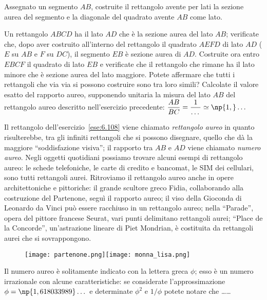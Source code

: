 \begin{esercizio}
\label{ese:6.107}
Assegnato un segmento $AB$, costruite il rettangolo avente per lati la sezione aurea del segmento e la diagonale del quadrato avente $AB$ come lato.
\end{esercizio}

\begin{esercizio}
\label{ese:6.108}
Un rettangolo $ABCD$ ha il lato $AD$ che è la sezione aurea del lato $AB$; verificate che, dopo aver costruito all'interno del rettangolo il quadrato $AEFD$ di lato $AD$ ($E$ su $AB$ e $F$ su $DC$), il segmento $EB$ è sezione aurea di $AD$. Costruite ora entro $EBCF$ il quadrato di lato $EB$ e verificate che il rettangolo che rimane ha il lato minore che è sezione aurea del lato maggiore. Potete affermare che tutti i rettangoli che via via si possono costruire sono tra loro simili? Calcolate il valore esatto del rapporto aureo, supponendo unitaria la misura del lato $AB$ del rettangolo aureo descritto nell'esercizio precedente: $\dfrac{AB}{BC}=\dfrac{1}{\ldots{}}\simeq \np{1,}\ldots{}$
\end{esercizio}

Il rettangolo dell'esercizio~\ref{ese:6.108} viene chiamato \emph{rettangolo aureo} in quanto risulterebbe, tra gli infiniti rettangoli che si possono disegnare, quello che dà la maggiore ``soddisfazione visiva''; il rapporto tra $AB$ e $AD$ viene chiamato \emph{numero aureo}. 
Negli oggetti quotidiani possiamo trovare alcuni esempi di rettangolo aureo: le schede telefoniche, le carte di credito e bancomat, le SIM dei cellulari, sono tutti rettangoli aurei.
Ritroviamo il rettangolo aureo anche in opere architettoniche e pittoriche: il grande scultore greco Fidia, collaborando alla costruzione del Partenone, seguì il rapporto aureo; il viso della Gioconda di Leonardo da Vinci può essere racchiuso in un rettangolo aureo; nella ``Parade'', opera del pittore francese Seurat, vari punti delimitano rettangoli aurei; ``Place de la Concorde'', un'astrazione lineare di Piet Mondrian, è costituita da rettangoli aurei che si sovrappongono.

\begin{figure*}[!htb]
	\centering\texttt{[image: partenone.png]}\qquad\texttt{[image: monna\_lisa.png]}
\end{figure*}

\begin{esercizio}
\label{ese:6.109}
Il numero aureo è solitamente indicato con la lettera greca $\phi$; esso è un numero irrazionale con alcune caratteristiche: se considerate l'approssimazione $\phi=\np{1,618033989}\ldots{}$ e determinate $\phi^2$ e $1/\phi$ potete notare che \ldots\ldots{}
\end{esercizio}

